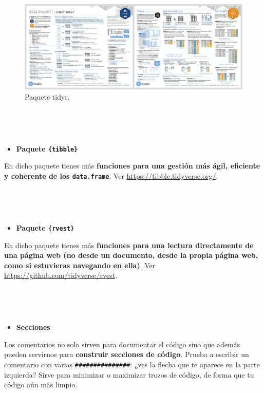 \documentclass[11pt,]{book}
\providecommand{\tightlist}{%
  \setlength{\itemsep}{0pt}\setlength{\parskip}{0pt}}
\begin{document}
\begin{figure}

{\centering \includegraphics[width=0.95\linewidth]{./img/tidyr} 

}

\caption{Paquete tidyr.}\label{fig:tidyr}
\end{figure}

~

~

\begin{itemize}
\tightlist
\item
  \textbf{Paquete \texttt{\{tibble\}}}
\end{itemize}

En dicho paquete tienes más \textbf{funciones para una gestión más ágil, eficiente y coherente de los \texttt{data.frame}}. Ver \url{https://tibble.tidyverse.org/}.

~

~

\begin{itemize}
\tightlist
\item
  \textbf{Paquete \texttt{\{rvest\}}}
\end{itemize}

En dicho paquete tienes más \textbf{funciones para una lectura directamente de una página web (no desde un documento, desde la propia página web, como si estuvieras navegando en ella)}. Ver \url{https://github.com/tidyverse/rvest}.

~

~

\begin{itemize}
\tightlist
\item
  \textbf{Secciones}
\end{itemize}

Los comentarios no solo sirven para documentar el código sino que además pueden servirnos para \textbf{construir secciones de código}. Prueba a escribir un comentario con varias \texttt{\#\#\#\#\#\#\#\#\#\#\#\#\#\#\#}: ¿ves la flecha que te aparece en la parte izquierda? Sirve para minimizar o maximizar trozos de código, de forma que tu código aún más limpio.
\end{document}

